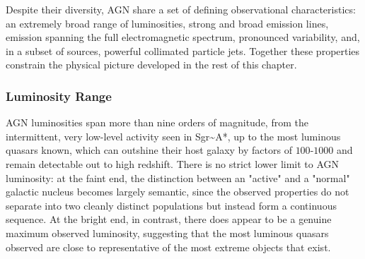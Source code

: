 Despite their diversity, AGN share a set of defining observational characteristics: an extremely broad range of luminosities, strong and broad emission lines, emission spanning the full electromagnetic spectrum, pronounced variability, and, in a subset of sources, powerful collimated particle jets. Together these properties constrain the physical picture developed in the rest of this chapter.

\subsubsection{Luminosity Range} \label{subsec:agn_luminosity}

AGN luminosities span more than nine orders of magnitude, from the intermittent, very low-level activity seen in Sgr\textasciitilde{}A*, up to the most luminous quasars known, which can outshine their host galaxy by factors of $100$-$1000$ and remain detectable out to high redshift. There is no strict lower limit to AGN luminosity: at the faint end, the distinction between an "active" and a "normal" galactic nucleus becomes largely semantic, since the observed properties do not separate into two cleanly distinct populations but instead form a continuous sequence. At the bright end, in contrast, there does appear to be a genuine maximum observed luminosity, suggesting that the most luminous quasars observed are close to representative of the most extreme objects that exist.


\medskip

